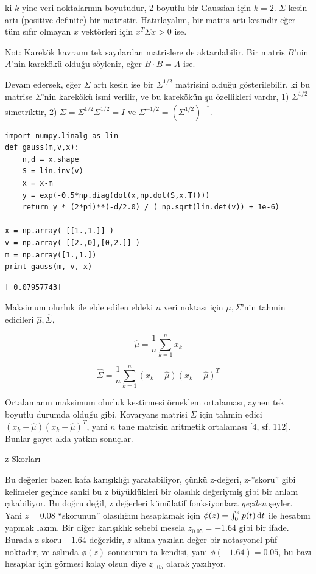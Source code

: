 \documentclass[12pt,fleqn]{article}\usepackage{../../common}
\begin{document}
ki $k$ yine veri noktalarının boyutudur, 2 boyutlu bir Gaussian için
$k=2$. $\Sigma$ kesin artı (positive definite) bir matristir. Hatırlayalım, bir
matris artı kesindir eğer tüm sıfır olmayan $x$ vektörleri için $x^T\Sigma x >
0$ ise.

Not: Karekök kavramı tek sayılardan matrislere de aktarılabilir. Bir
matris $B$'nin $A$'nin karekökü olduğu söylenir, eğer $B \cdot B = A$ ise.

Devam edersek, eğer $\Sigma$ artı kesin ise bir $\Sigma^{1/2}$ matrisini olduğu
gösterilebilir, ki bu matrise $\Sigma$'nin karekökü ismi verilir, ve bu
karekökün şu özellikleri vardır, 1) $\Sigma^{1/2}$ simetriktir, 2) $\Sigma =
\Sigma^{1/2}\Sigma^{1/2} = I$ ve $\Sigma^{-1/2} = (\Sigma^{1/2})^{-1}$.

\begin{verbatim}
import numpy.linalg as lin
def gauss(m,v,x):
    n,d = x.shape
    S = lin.inv(v)
    x = x-m
    y = exp(-0.5*np.diag(dot(x,np.dot(S,x.T))))
    return y * (2*pi)**(-d/2.0) / ( np.sqrt(lin.det(v)) + 1e-6)

x = np.array( [[1.,1.]] )
v = np.array( [[2.,0],[0,2.]] )
m = np.array([1.,1.])
print gauss(m, v, x)
\end{verbatim}

\begin{verbatim}
[ 0.07957743]
\end{verbatim}

Maksimum olurluk ile elde edilen eldeki $n$ veri noktası için $\mu,\Sigma$'nin
tahmin edicileri $\hat{\mu},\hat{\Sigma}$,

$$ \hat{\mu} = \frac{1}{n} \sum _{k=1}^{n} x_k $$

$$ \hat{\Sigma} = \frac{1}{n} \sum _{k=1}^{n} (x_k-\hat{\mu}) (x_k-\hat{\mu})^T $$

Ortalamanın maksimum olurluk kestirmesi örneklem ortalaması, aynen tek boyutlu
durumda olduğu gibi. Kovaryans matrisi $\Sigma$ için tahmin edici
$(x_k-\hat{\mu}) (x_k-\hat{\mu})^T$, yani $n$ tane matrisin aritmetik ortalaması
[4, sf. 112]. Bunlar gayet akla yatkın sonuçlar.


z-Skorları

Bu değerler bazen kafa karışıklığı yaratabiliyor, çünkü z-değeri, z-''skoru''
gibi kelimeler geçince sanki bu z büyüklükleri bir olasılık değeriymiş gibi bir
anlam çıkabiliyor. Bu doğru değil, z değerleri kümülatif fonksiyonlara {\em
  geçilen} şeyler. Yani $z=0.08$ ``skorunun'' olasılığını hesaplamak için
$\phi(z) = \int_{0}^{z} p(t) \,\mathrm{d} t$ ile hesabını yapmak lazım. Bir diğer
karışıklık sebebi mesela $z_{0.05} = -1.64$ gibi bir ifade. Burada z-skoru
$-1.64$ değeridir, $z$ altına yazılan değer bir notasyonel püf noktadır, ve
aslında $\phi(z)$ sonucunun ta kendisi, yani $\phi(-1.64) = 0.05$, bu bazı
hesaplar için görmesi kolay olsun diye $z_{0.05}$ olarak yazılıyor.
\end{document}
